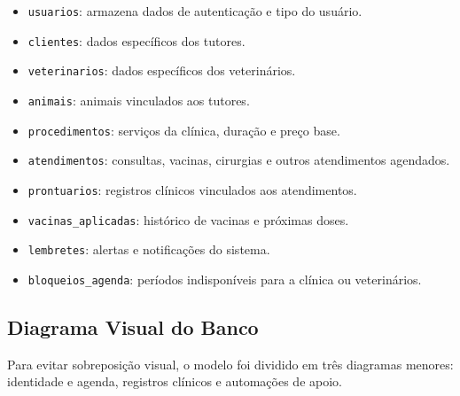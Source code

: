 \documentclass[12pt,a4paper]{article}
\begin{document}
\begin{itemize}[leftmargin=*]
  \item \texttt{usuarios}: armazena dados de autenticação e tipo do usuário.
  \item \texttt{clientes}: dados específicos dos tutores.
  \item \texttt{veterinarios}: dados específicos dos veterinários.
  \item \texttt{animais}: animais vinculados aos tutores.
  \item \texttt{procedimentos}: serviços da clínica, duração e preço base.
  \item \texttt{atendimentos}: consultas, vacinas, cirurgias e outros atendimentos agendados.
  \item \texttt{prontuarios}: registros clínicos vinculados aos atendimentos.
  \item \texttt{vacinas\_aplicadas}: histórico de vacinas e próximas doses.
  \item \texttt{lembretes}: alertas e notificações do sistema.
  \item \texttt{bloqueios\_agenda}: períodos indisponíveis para a clínica ou veterinários.
\end{itemize}

\subsection{Diagrama Visual do Banco}

\noindent Para evitar sobreposição visual, o modelo foi dividido em três diagramas menores: identidade e agenda, registros clínicos e automações de apoio.
\end{document}
